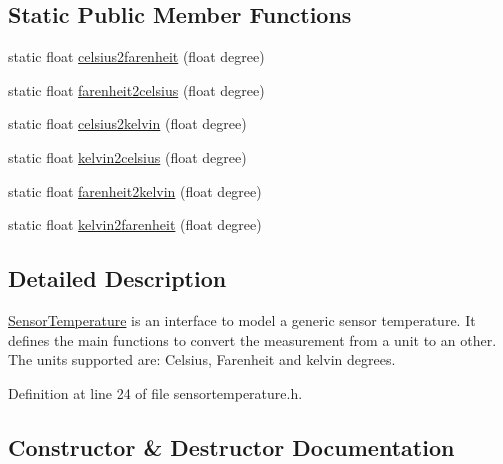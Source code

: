 \subsection*{Static Public Member Functions}
\begin{DoxyCompactItemize}
\item 
static float \hyperlink{classsmrtobj_1_1io_1_1_sensor_temperature_ae5dc959e4b7594c4391e11422befc1d4}{celsius2farenheit} (float degree)
\item 
static float \hyperlink{classsmrtobj_1_1io_1_1_sensor_temperature_a149aa907b8b6809af604fa26ca4ab195}{farenheit2celsius} (float degree)
\item 
static float \hyperlink{classsmrtobj_1_1io_1_1_sensor_temperature_a3b37e6573c43fa26fd3cf9479e8a58b7}{celsius2kelvin} (float degree)
\item 
static float \hyperlink{classsmrtobj_1_1io_1_1_sensor_temperature_a19f7bc55c7c52aec53c9e28cefa79c42}{kelvin2celsius} (float degree)
\item 
static float \hyperlink{classsmrtobj_1_1io_1_1_sensor_temperature_a14838f9c052b09b64da47c0544975502}{farenheit2kelvin} (float degree)
\item 
static float \hyperlink{classsmrtobj_1_1io_1_1_sensor_temperature_a526a3716f3b1f38ad376bb5c8d3649a4}{kelvin2farenheit} (float degree)
\end{DoxyCompactItemize}


\subsection{Detailed Description}
\hyperlink{classsmrtobj_1_1io_1_1_sensor_temperature}{Sensor\+Temperature} is an interface to model a generic sensor temperature. It defines the main functions to convert the measurement from a unit to an other. The units supported are\+: Celsius, Farenheit and kelvin degrees. 

Definition at line 24 of file sensortemperature.\+h.



\subsection{Constructor \& Destructor Documentation}
\hypertarget{classsmrtobj_1_1io_1_1_sensor_temperature_a48b0c65a7f0936a7fc1dd5925755c2b4}{}
